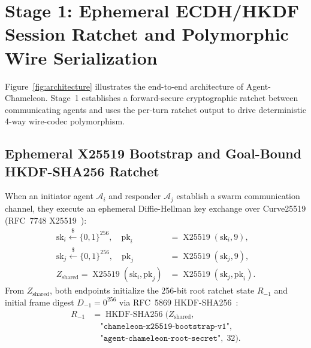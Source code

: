\documentclass[conference,10pt]{IEEEtran}
\begin{document}
\section{Stage 1: Ephemeral ECDH/HKDF Session Ratchet and Polymorphic Wire Serialization}
\label{sec:stage1}

Figure~\ref{fig:architecture} illustrates the end-to-end architecture of Agent-Chameleon. Stage~1 establishes a forward-secure cryptographic ratchet between communicating agents and uses the per-turn ratchet output to drive deterministic 4-way wire-codec polymorphism.

\subsection{Ephemeral X25519 Bootstrap and Goal-Bound HKDF-SHA256 Ratchet}
When an initiator agent $\mathcal{A}_i$ and responder $\mathcal{A}_j$ establish a swarm communication channel, they execute an ephemeral Diffie-Hellman key exchange over Curve25519 (RFC~7748 X25519~\cite{langley2016x25519}):
\begin{equation}
\label{eq:x25519}
\begin{aligned}
\text{sk}_i \xleftarrow{\$} \{0,1\}^{256}, \quad \text{pk}_i &= \operatorname{X25519}(\text{sk}_i, 9), \\
\text{sk}_j \xleftarrow{\$} \{0,1\}^{256}, \quad \text{pk}_j &= \operatorname{X25519}(\text{sk}_j, 9), \\
Z_{\text{shared}} = \operatorname{X25519}(\text{sk}_i, \text{pk}_j) &= \operatorname{X25519}(\text{sk}_j, \text{pk}_i).
\end{aligned}
\end{equation}
From $Z_{\text{shared}}$, both endpoints initialize the 256-bit root ratchet state $R_{-1}$ and initial frame digest $D_{-1} = 0^{256}$ via RFC~5869 HKDF-SHA256~\cite{krawczyk2010hkdf}:
\begin{equation}
\label{eq:root_init}
\begin{aligned}
R_{-1} &= \operatorname{HKDF-SHA256}\Big(Z_{\text{shared}}, \\
&\quad \texttt{"chameleon-x25519-bootstrap-v1"}, \\
&\quad \texttt{"agent-chameleon-root-secret"},\; 32\Big).
\end{aligned}
\end{equation}
\end{document}
